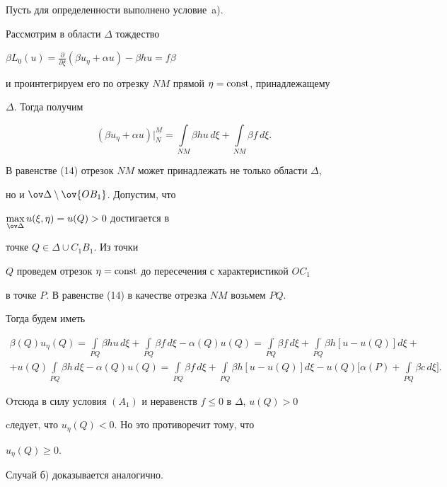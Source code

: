 \begin{pf}


Пусть для определенности выполнено условие~a). 


Рассмотрим в области $\Delta$ тождество


$\beta L_0(u)=\frac{\partial}{\partial \xi}(\beta u_{\eta}+\alpha u)-


\beta hu=f\beta$


и проинтегрируем его по отрезку $NM$ прямой $\eta=\operatorname{const}$, принадлежащему


$\Delta$. Тогда получим


\begin{equation}


(\beta u_{\eta }+\alpha u)\big|_N^M=\int \limits_{NM}\beta hu\,d\xi


+\int \limits_{NM}\beta f\,d\xi.


\end{equation}


В равенстве (14) отрезок $NM$ может принадлежать не только области $\Delta$,


но и $\ov \Delta \setminus \ov {OB_1}$. Допустим, что 


$\max \limits_{\ov \Delta }u(\xi,\eta)=u(Q)>0 $ достигается в 


точке $Q\in \Delta \cup C_1B_1$. Из точки


$Q$ проведем отрезок $\eta=\operatorname{const}$ до пересечения с характеристикой $OC_1$ 


в точке $P$. В равенстве (14) в качестве отрезка $NM$ возьмем $PQ$. 


Тогда будем иметь


\begin{multline*}


\beta (Q)u_{\eta }(Q)=\int \limits_{PQ}\beta hu\,d\xi 


+\int \limits_{PQ}\beta f\,d\xi -\alpha (Q)u(Q)=


\int\limits_{PQ}\beta f\,d\xi+\int\limits_{PQ}\beta h[u-u(Q)]d\xi+\\


%


+u(Q)\int\limits_{PQ}\beta h\,d\xi-\alpha (Q)u(Q)=


\int\limits_{PQ}\beta f\,d\xi +


\int\limits_{PQ}\beta h[u-u(Q)]d\xi 


-u(Q)\bigg[\alpha (P)+\int \limits_{PQ}\beta c\,d\xi].


\end{multline*}


Oтсюда в силу условия $(A_1)$ и неравенств $f\le 0$ в $\Delta$, $u(Q)>0$ 


cледует, что $u_{\eta }(Q)<0$. Но это противоречит тому, что


$u_{\eta }(Q)\ge 0$.





Случай б) доказывается аналогично.


\end{pf}





